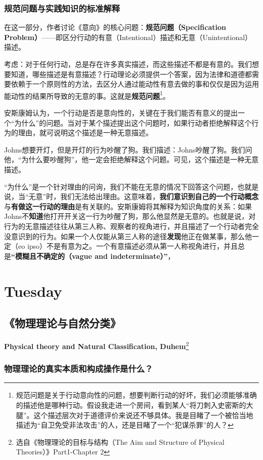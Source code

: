\documentclass[12pt, a4paper, oneside]{ctexart}
\renewcommand{\b}{\textbf}
\newcommand{\f}{\footnote}
\begin{document}
\subsubsection{规范问题与实践知识的标准解释}
在这一部分，作者讨论《意向》的核心问题：\b{规范问题（Specification Problem）}——即区分行动的有意（Intentional）描述和无意（Unintentional）描述。

考虑：对于任何行动，总是存在许多真实描述，而这些描述不都是有意的。我们想要知道，哪些描述是有意描述？行动理论必须提供一个答案，因为法律和道德都需要依赖于一个原则性的方法，去区分人通过能动性有意去做的事和仅仅是因为运用能动性的结果所导致的无意的事。这就是\b{规范问题}\f{规范问题是关于行动意向性的问题，想要判断行动的好坏，我们必须能够准确的描述他是哪种行动。假设我走进一个房间，看到某人“将刀刺入史密斯的大腿”。这个描述层次对于道德评价来说还不够具体。我是目睹了一个被恰当地描述为“自卫免受非法攻击”的人，还是目睹了一个“犯谋杀罪”的人？}。

安斯康姆认为，一个行动是否是意向性的，关键在于我们能否有意义的提出一个“为什么”的问题。当对于某个描述提出这个问题时，如果行动者拒绝解释这个行为的理由，就可说明这个描述是一种无意描述。

Johns想要开灯，但是开灯的行为吵醒了狗。我们描述：Johns吵醒了狗。我们问他，“为什么要吵醒狗”，他一定会拒绝解释这个问题。可见，这个描述是一种无意描述。

“为什么”是一个针对理由的问询，我们不能在无意的情况下回答这个问题，也就是说，当“无意”时，我们无法给出理由。这意味着，\b{我们意识到自己的一个行动概念}与\b{有做这一行动的理由}是有关联的。安斯康姆将其解释为知识角度的关系：如果Johns不\b{知道}他打开开关这一行为吵醒了狗，那么他显然是无意的。也就是说，对行为的无意描述往往从第三人称、观察者的视角进行，并且描述了一个行动者完全没意识到的行为。如果一个人仅能从第三人称的途径\b{发现}他正在做某事，那么他一定（eo ipso）不是有意为之。一个有意描述必须从第一人称视角进行，并且总是\b{“模糊且不确定的（vague and indeterminate）”}，

\section{Tuesday}
\subsection{《物理理论与自然分类》}
\textbf{Physical theory and Natural Classification, Duhem}\f{选自《物理理论的目标与结构（The Aim and Structure of Physical Theories）》Part1-Chapter 2}

\subsubsection{物理理论的真实本质和构成操作是什么？}
\end{document}
